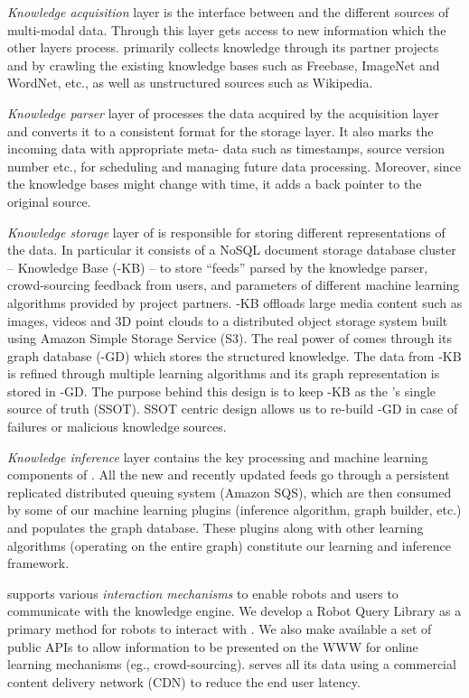 
\textit{Knowledge acquisition} layer is the interface between \robobrain{} and the
different sources of multi-modal data. Through this layer \robobrain{} gets access to new information which the other layers process.  \robobrain{} primarily collects knowledge through its partner projects and by crawling the existing knowledge bases such as Freebase, ImageNet and WordNet, etc.,  as well as unstructured sources such as  Wikipedia.


\textit{Knowledge parser} layer of \robobrain{} processes the data acquired by the acquisition layer and converts it to a consistent format for the storage layer. It also marks the incoming data with appropriate meta- data such as  timestamps, source version number etc., for scheduling and managing future data processing. Moreover, since the knowledge bases might change with time, it adds a back pointer to the original source.

\textit{Knowledge storage} layer of \robobrain{} is responsible for storing different representations of the data. In particular it consists of a NoSQL document storage database cluster -- \robobrain{} Knowledge Base (\robobrain{}-KB) -- to store ``feeds'' parsed by the knowledge parser, crowd-sourcing feedback from users, and parameters of different machine learning algorithms provided by \robobrain{} project partners. \robobrain{}-KB offloads large media content such as images, videos and 3D point clouds to a distributed object storage system built using Amazon Simple Storage Service (S3). The real power of \robobrain{} comes through its graph database (\robobrain{}-GD) which stores the structured knowledge. The data from \robobrain{}-KB is refined through multiple learning algorithms and its graph representation is stored in \robobrain{}-GD. The purpose behind this design is to keep \robobrain{}-KB as the \robobrain{}'s single source of truth (SSOT). SSOT centric design allows us to re-build \robobrain{}-GD in case of failures or malicious knowledge sources.

\textit{Knowledge inference} layer contains the key processing and machine learning components of \robobrain{}. All the new and recently updated feeds go through a persistent replicated distributed queuing system (Amazon SQS), which are then consumed by some of our machine learning plugins (inference algorithm, graph builder, etc.) and populates the graph database. These plugins along with  other learning algorithms (operating on the entire graph) constitute our learning and inference framework. 

\robobrain{} supports various \textit{interaction mechanisms} to enable robots and users to communicate with the knowledge engine.
We develop a Robot Query Library as a primary method for robots to interact with \robobrain{}. We also make available a set of public APIs to allow information to be presented on the WWW for online learning mechanisms (eg., crowd-sourcing). \robobrain{} serves all its data using a commercial content delivery network (CDN) to reduce the end user latency. 